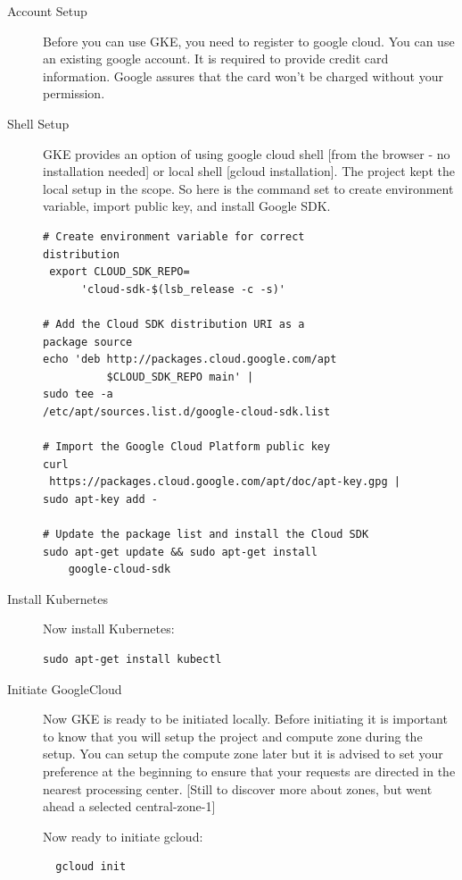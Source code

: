 \begin{description}

\item[Account Setup] Before you can use GKE, you need to register to google
  cloud. You can use an existing google account. It is required to provide
  credit card information.  Google assures that the card won't be charged
  without your permission.

\item[Shell Setup] GKE provides an option of using google cloud shell [from
  the browser - no installation needed] or local shell [gcloud installation].
  The project kept the local setup in the scope. So here is the command set to
  create environment variable, import public key, and install Google SDK.

\begin{verbatim}
# Create environment variable for correct 
distribution
 export CLOUD_SDK_REPO=
      'cloud-sdk-$(lsb_release -c -s)'

# Add the Cloud SDK distribution URI as a 
package source
echo 'deb http://packages.cloud.google.com/apt 
          $CLOUD_SDK_REPO main' | 
sudo tee -a 
/etc/apt/sources.list.d/google-cloud-sdk.list

# Import the Google Cloud Platform public key
curl
 https://packages.cloud.google.com/apt/doc/apt-key.gpg | 
sudo apt-key add -

# Update the package list and install the Cloud SDK
sudo apt-get update && sudo apt-get install 
    google-cloud-sdk
\end{verbatim}

\item[Install Kubernetes] Now install Kubernetes:

\begin{verbatim}
sudo apt-get install kubectl
\end{verbatim}

\item[Initiate GoogleCloud] Now GKE is ready to be initiated locally. Before
initiating it is important to know that you will setup the project and compute
zone during the setup. You can setup the compute zone later but it is advised
to set your preference at the beginning to ensure that your requests are
directed in the nearest processing center. [Still to discover more about
zones, but went ahead a selected central-zone-1] 

Now ready to initiate gcloud:
\begin{verbatim}
  gcloud init
\end{verbatim}


\end{description}
